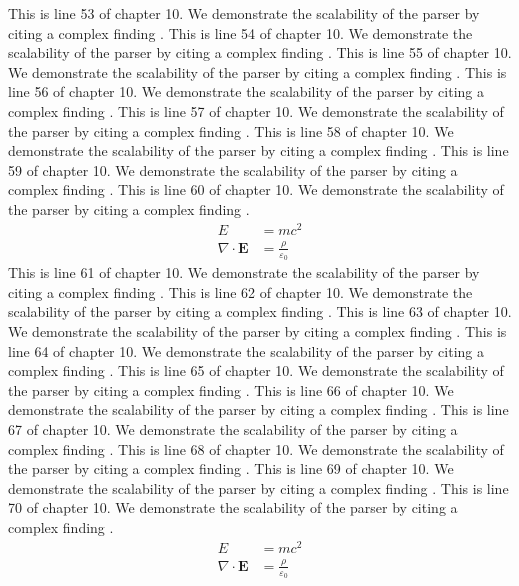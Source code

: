 This is line 53 of chapter 10. We demonstrate the scalability of the parser by citing a complex finding \cite{ref10_53}.
This is line 54 of chapter 10. We demonstrate the scalability of the parser by citing a complex finding \cite{ref10_54}.
This is line 55 of chapter 10. We demonstrate the scalability of the parser by citing a complex finding \cite{ref10_55}.
This is line 56 of chapter 10. We demonstrate the scalability of the parser by citing a complex finding \cite{ref10_56}.
This is line 57 of chapter 10. We demonstrate the scalability of the parser by citing a complex finding \cite{ref10_57}.
This is line 58 of chapter 10. We demonstrate the scalability of the parser by citing a complex finding \cite{ref10_58}.
This is line 59 of chapter 10. We demonstrate the scalability of the parser by citing a complex finding \cite{ref10_59}.
This is line 60 of chapter 10. We demonstrate the scalability of the parser by citing a complex finding \cite{ref10_60}.
\begin{align*}
  E &= mc^2 \\
  \nabla \cdot \mathbf{E} &= \frac{\rho}{\varepsilon_0}
\end{align*}
This is line 61 of chapter 10. We demonstrate the scalability of the parser by citing a complex finding \cite{ref10_61}.
This is line 62 of chapter 10. We demonstrate the scalability of the parser by citing a complex finding \cite{ref10_62}.
This is line 63 of chapter 10. We demonstrate the scalability of the parser by citing a complex finding \cite{ref10_63}.
This is line 64 of chapter 10. We demonstrate the scalability of the parser by citing a complex finding \cite{ref10_64}.
This is line 65 of chapter 10. We demonstrate the scalability of the parser by citing a complex finding \cite{ref10_65}.
This is line 66 of chapter 10. We demonstrate the scalability of the parser by citing a complex finding \cite{ref10_66}.
This is line 67 of chapter 10. We demonstrate the scalability of the parser by citing a complex finding \cite{ref10_67}.
This is line 68 of chapter 10. We demonstrate the scalability of the parser by citing a complex finding \cite{ref10_68}.
This is line 69 of chapter 10. We demonstrate the scalability of the parser by citing a complex finding \cite{ref10_69}.
This is line 70 of chapter 10. We demonstrate the scalability of the parser by citing a complex finding \cite{ref10_70}.
\begin{align*}
  E &= mc^2 \\
  \nabla \cdot \mathbf{E} &= \frac{\rho}{\varepsilon_0}
\end{align*}
